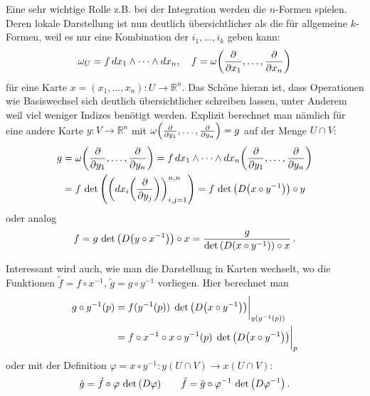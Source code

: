 \documentclass[../H_Analysis_main.tex]{subfiles}
\begin{document}
\begin{bsp}[$n$-Formen]
Eine sehr wichtige Rolle z.B. bei der Integration werden die $n$-Formen spielen. Deren lokale Darstellung ist nun deutlich übersichtlicher als die für allgemeine $k$-Formen, weil es nur eine Kombination der $i_1, \dots, i_k$ geben kann:
\begin{equation*}
\omega_U = f \, dx_1 \wedge \dots \wedge dx_n, \quad f = \omega\qty(\pdv{x_1}, \dots, \pdv{x_n})
\end{equation*}
für eine Karte $x = (x_1, \dots, x_n): U \rightarrow \mathbb{R}^n$. Das Schöne hieran ist, dass Operationen wie Basiswechsel sich deutlich übersichtlicher schreiben lassen, unter Anderem weil viel weniger Indizes benötigt werden. Explizit berechnet man nämlich für eine andere Karte $y: V \rightarrow \mathbb{R}^n$ mit $\omega\qty(\pdv{y_1}, \dots, \pdv{y_n}) = g$ auf der Menge $U \cap V$:
\begin{align}\label{eq:nformwechsel}
g &= \omega\qty(\pdv{y_1}, \dots, \pdv{y_n}) = f \, dx_1 \wedge \dots \wedge dx_n \qty(\pdv{y_1}, \dots, \pdv{y_n}) 
\notag\\
&= f \, \det\qty(\qty(dx_i\qty(\pdv{y_j}))_{i, j = 1}^{n, n}) = f \, \det\qty(D \qty(x \circ y^{-1})) \circ y
\end{align}
oder analog
\begin{equation}
f = g \, \det\qty(D\qty(y \circ x^{-1})) \circ x = \frac{g}{\det\qty(D\qty(x \circ y^{-1})) \circ x} \, .
\end{equation}


Interessant wird auch, wie man die Darstellung in Karten wechselt, wo die Funktionen $\tilde{f} = f \circ x^{-1}, \, \tilde{g} = g \circ y^{-1}$ vorliegen. Hier berechnet man
\begin{align*}
g \circ y^{-1} (p) &= f(y^{-1}(p)) \, \eval{\det\qty(D\qty(x \circ y^{-1}))}_{y(y^{-1}(p))} 
\\
&= f \circ x^{-1} \circ x \circ y^{-1} (p) \, \eval{\det\qty(D\qty(x \circ y^{-1}))}_p
\end{align*}
oder mit der Definition $\varphi = x \circ y^{-1}: y(U \cap V) \rightarrow x(U \cap V)$:
\begin{equation}
\tilde{g} = \tilde{f} \circ \varphi \, \det\qty(D\varphi) \qquad \tilde{f} = \tilde{g} \circ \varphi^{-1} \, \det\qty(D\varphi^{-1}) \, .
\end{equation}
\end{bsp}
\end{document}
